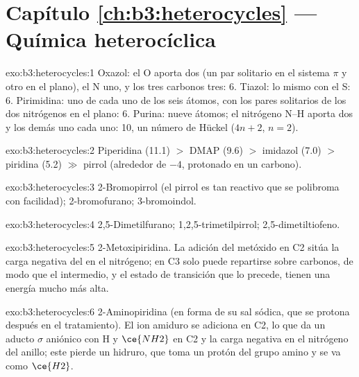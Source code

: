 \section*{Capítulo \ref{ch:b3:heterocycles} --- Química heterocíclica}

\begin{solution}{exo:b3:heterocycles:1}
Oxazol: el O aporta dos (un par solitario en el sistema $\pi$ y otro en el plano), el N uno, y los
tres carbonos tres: 6. Tiazol: lo mismo con el S: 6. Pirimidina: uno de cada uno
de los seis átomos, con los pares solitarios de los dos nitrógenos en el plano: 6. Purina: nueve átomos;
el nitrógeno N--H aporta dos y los demás uno cada uno: 10, un número de Hückel
($4n + 2$, $n = 2$).
\end{solution}

\begin{solution}{exo:b3:heterocycles:2}
Piperidina (11.1) $>$ DMAP (9.6) $>$ imidazol (7.0) $>$ piridina (5.2) $\gg$ pirrol (alrededor de $-4$,
protonado en un carbono).
\end{solution}

\begin{solution}{exo:b3:heterocycles:3}
2-Bromopirrol (el pirrol es tan reactivo que se polibroma con facilidad);
2-bromofurano; 3-bromoindol.
\end{solution}

\begin{solution}{exo:b3:heterocycles:4}
2,5-Dimetilfurano; 1,2,5-trimetilpirrol; 2,5-dimetiltiofeno.
\end{solution}

\begin{solution}{exo:b3:heterocycles:5}
2-Metoxipiridina. La adición del metóxido en C2 sitúa la carga negativa del
 en el nitrógeno; en C3 solo puede repartirse sobre carbonos, de modo que el
intermedio, y el estado de transición que lo precede, tienen una energía mucho más alta.
\end{solution}

\begin{solution}{exo:b3:heterocycles:6}
2-Aminopiridina (en forma de su sal sódica, que se protona después en el tratamiento). El ion amiduro
se adiciona en C2, lo que da un aducto $\sigma$ aniónico con H y $\ce{NH2}$ en C2 y la carga
negativa en el nitrógeno del anillo; este pierde un hidruro, que toma un protón del
grupo amino y se va como $\ce{H2}$.
\end{solution}


